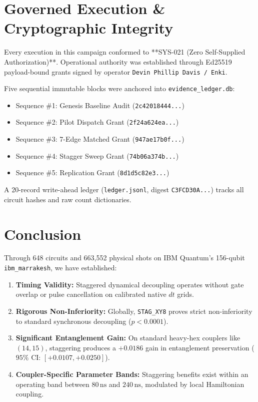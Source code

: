 \documentclass[twocolumn,aps,pra,superscriptaddress,showpacs,floatfix]{revtex4-2}
\begin{document}
\section{Governed Execution \& Cryptographic Integrity}

Every execution in this campaign conformed to **SYS-021 (Zero Self-Supplied Authorization)**. Operational authority was established through Ed25519 payload-bound grants signed by operator \texttt{Devin Phillip Davis / Enki}.

Five sequential immutable blocks were anchored into \texttt{evidence\_ledger.db}:
\begin{itemize}
    \item Sequence \#1: Genesis Baseline Audit (\texttt{2c42018444...})
    \item Sequence \#2: Pilot Dispatch Grant (\texttt{2f24a624ea...})
    \item Sequence \#3: 7-Edge Matched Grant (\texttt{947ae17b0f...})
    \item Sequence \#4: Stagger Sweep Grant (\texttt{74b06a374b...})
    \item Sequence \#5: Replication Grant (\texttt{8d1d5c82e3...})
\end{itemize}
A 20-record write-ahead ledger (\texttt{ledger.jsonl}, digest \texttt{C3FCD30A...}) tracks all circuit hashes and raw count dictionaries.

\section{Conclusion}

Through 648 circuits and 663,552 physical shots on IBM Quantum's 156-qubit \texttt{ibm\_marrakesh}, we have established:
\begin{enumerate}
    \item \textbf{Timing Validity:} Staggered dynamical decoupling operates without gate overlap or pulse cancellation on calibrated native $dt$ grids.
    \item \textbf{Rigorous Non-Inferiority:} Globally, \texttt{STAG\_XY8} proves strict non-inferiority to standard synchronous decoupling ($p < 0.0001$).
    \item \textbf{Significant Entanglement Gain:} On standard heavy-hex couplers like $(14, 15)$, staggering produces a $+0.0186$ gain in entanglement preservation ($95\%\text{ CI: } [+0.0107, +0.0250]$).
    \item \textbf{Coupler-Specific Parameter Bands:} Staggering benefits exist within an operating band between $80\,\mathrm{ns}$ and $240\,\mathrm{ns}$, modulated by local Hamiltonian coupling.
\end{enumerate}
\end{document}
